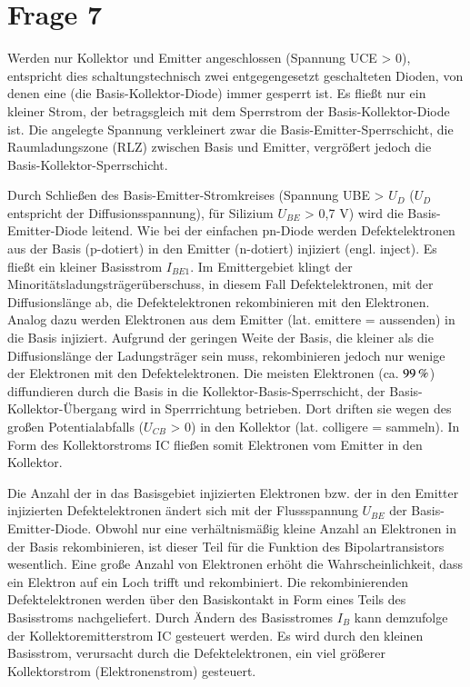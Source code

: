 \section{Frage 7}

Werden nur Kollektor und Emitter angeschlossen (Spannung UCE > 0), entspricht dies schaltungstechnisch zwei entgegengesetzt geschalteten Dioden, von denen eine (die Basis-Kollektor-Diode) immer gesperrt ist. Es fließt nur ein kleiner Strom, der betragsgleich mit dem Sperrstrom der Basis-Kollektor-Diode ist. Die angelegte Spannung verkleinert zwar die Basis-Emitter-Sperrschicht, die Raumladungszone (RLZ) zwischen Basis und Emitter, vergrößert jedoch die Basis-Kollektor-Sperrschicht.

Durch Schließen des Basis-Emitter-Stromkreises (Spannung UBE > $U_D$ ($U_D$ entspricht der Diffusionsspannung), für Silizium $U_{BE}$ > 0,7 V) wird die Basis-Emitter-Diode leitend. Wie bei der einfachen pn-Diode werden Defektelektronen aus der Basis (p-dotiert) in den Emitter (n-dotiert) injiziert (engl. inject). Es fließt ein kleiner Basisstrom $I_{BE1}$. Im Emittergebiet klingt der Minoritätsladungsträgerüberschuss, in diesem Fall Defektelektronen, mit der Diffusionslänge ab, die Defektelektronen rekombinieren mit den Elektronen. Analog dazu werden Elektronen aus dem Emitter (lat. emittere = aussenden) in die Basis injiziert. Aufgrund der geringen Weite der Basis, die kleiner als die Diffusionslänge der Ladungsträger sein muss, rekombinieren jedoch nur wenige der Elektronen mit den Defektelektronen. Die meisten Elektronen (ca. $\unit[99]{\%}$) diffundieren durch die Basis in die Kollektor-Basis-Sperrschicht, der Basis-Kollektor-Übergang wird in Sperrrichtung betrieben. Dort driften sie wegen des großen Potentialabfalls ($U_{CB}$ > 0) in den Kollektor (lat. colligere = sammeln). In Form des Kollektorstroms IC fließen somit Elektronen vom Emitter in den Kollektor.

Die Anzahl der in das Basisgebiet injizierten Elektronen bzw. der in den Emitter injizierten Defektelektronen ändert sich mit der Flussspannung $U_{BE}$ der Basis-Emitter-Diode. Obwohl nur eine verhältnismäßig kleine Anzahl an Elektronen in der Basis rekombinieren, ist dieser Teil für die Funktion des Bipolartransistors wesentlich. Eine große Anzahl von Elektronen erhöht die Wahrscheinlichkeit, dass ein Elektron auf ein Loch trifft und rekombiniert. Die rekombinierenden Defektelektronen werden über den Basiskontakt in Form eines Teils des Basisstroms nachgeliefert. Durch Ändern des Basisstromes $I_B$ kann demzufolge der Kollektoremitterstrom IC gesteuert werden. Es wird durch den kleinen Basisstrom, verursacht durch die Defektelektronen, ein viel größerer Kollektorstrom (Elektronenstrom) gesteuert.


